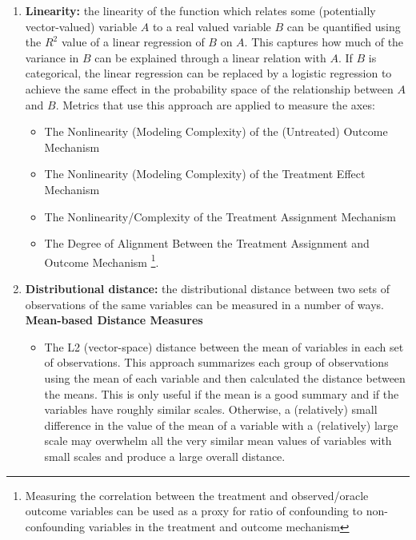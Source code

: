 \documentclass[../main.tex]{subfiles}
\begin{document}
\begin{enumerate}
    \item \textbf{Linearity:} the linearity of the function which relates some (potentially vector-valued) variable $A$ to a real valued variable $B$ can be quantified using the $R^2$ value of a linear regression of $B$ on $A$. This captures how much of the variance in $B$ can be explained through a linear relation with $A$. If $B$ is categorical, the linear regression can be replaced by a logistic regression to achieve the same effect in the probability space of the relationship between $A$ and $B$. Metrics that use this approach are applied to measure the axes:

    \begin{itemize}
        \item The Nonlinearity (Modeling Complexity) of the (Untreated) Outcome Mechanism
        \item The Nonlinearity (Modeling Complexity) of the Treatment Effect Mechanism
        \item The Nonlinearity/Complexity of the Treatment Assignment Mechanism
        \item The Degree of Alignment Between the Treatment Assignment and Outcome Mechanism \footnote{Measuring the correlation between the treatment and observed/oracle outcome variables can be used as a proxy for ratio of confounding to non-confounding variables in the treatment and outcome mechanism}.
    \end{itemize}

    \item \textbf{Distributional distance:} the distributional distance between two sets of observations of the same variables can be measured in a number of ways.
    \vspace{\baselineskip}
    \textbf{Mean-based Distance Measures}

    \begin{itemize}

        \item The L2 (vector-space) distance between the mean of variables in each set of observations. This approach summarizes each group of observations using the mean of each variable and then calculated the distance between the means. This is only useful if the mean is a good summary and if the variables have roughly similar scales. Otherwise, a (relatively) small difference in the value of the mean of a variable with a (relatively) large scale may overwhelm all the very similar mean values of variables with small scales and produce a large overall distance.


\end{itemize}
\end{enumerate}
\end{document}
